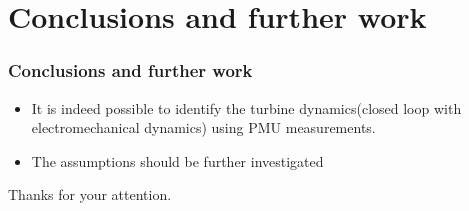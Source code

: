 \section{Conclusions and further work}
\begin{frame}
		\frametitle{Conclusions and further work}
	\begin{itemize}
		\item It is indeed possible to identify the turbine dynamics(closed loop with electromechanical dynamics) using PMU measurements.
		\item The assumptions should be further investigated
	\end{itemize}
\end{frame}
\begin{frame}
		\begin{center}
		\Huge	Thanks for your attention.
\end{center}
\end{frame}
